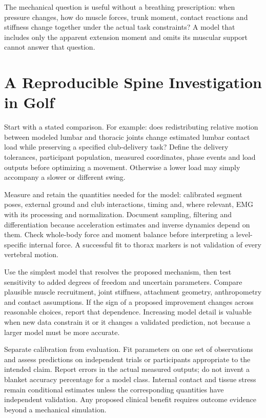 The mechanical question is useful without a breathing prescription: when pressure changes, how do muscle forces, trunk moment, contact reactions and stiffness change together under the actual task constraints? A model that includes only the apparent extension moment and omits its muscular support cannot answer that question.

\section{A Reproducible Spine Investigation in Golf}
\label{sec:practical_recommendations}

Start with a stated comparison. For example: does redistributing relative motion between modeled lumbar and thoracic joints change estimated lumbar contact load while preserving a specified club-delivery task? Define the delivery tolerances, participant population, measured coordinates, phase events and load outputs before optimizing a movement. Otherwise a lower load may simply accompany a slower or different swing.

Measure and retain the quantities needed for the model: calibrated segment poses, external ground and club interactions, timing and, where relevant, EMG with its processing and normalization. Document sampling, filtering and differentiation because acceleration estimates and inverse dynamics depend on them. Check whole-body force and moment balance before interpreting a level-specific internal force. A successful fit to thorax markers is not validation of every vertebral motion.

Use the simplest model that resolves the proposed mechanism, then test sensitivity to added degrees of freedom and uncertain parameters. Compare plausible muscle recruitment, joint stiffness, attachment geometry, anthropometry and contact assumptions. If the sign of a proposed improvement changes across reasonable choices, report that dependence. Increasing model detail is valuable when new data constrain it or it changes a validated prediction, not because a larger model must be more accurate.

Separate calibration from evaluation. Fit parameters on one set of observations and assess predictions on independent trials or participants appropriate to the intended claim. Report errors in the actual measured outputs; do not invent a blanket accuracy percentage for a model class. Internal contact and tissue stress remain conditional estimates unless the corresponding quantities have independent validation. Any proposed clinical benefit requires outcome evidence beyond a mechanical simulation.

